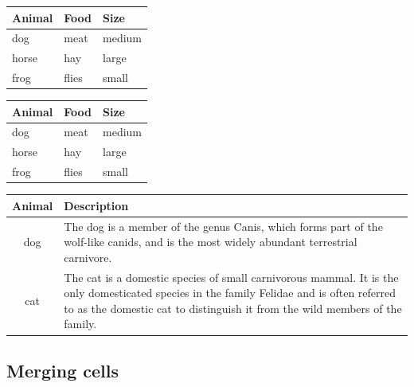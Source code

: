 \documentclass{article}
\begin{document}
\begin{tabular}{lll}
  \toprule
  Animal & Food  & Size   \\
  \midrule
  dog    & meat  & medium \\
  \cmidrule{1-2}
  horse  & hay   & large  \\
  \cmidrule{1-1}
  \cmidrule{3-3}
  frog   & flies & small  \\
  \bottomrule
\end{tabular}

\begin{tabular}{lll}
  \toprule
  Animal & Food  & Size   \\
  \midrule
  dog    & meat  & medium \\
  \cmidrule{1-2}
  horse  & hay   & large  \\
  \cmidrule(r){1-1}
  \cmidrule(rl){2-2}
  \cmidrule(l){3-3}
  frog   & flies & small  \\
  \bottomrule
\end{tabular}

\begin{tabular}{cp{9cm}}
  \toprule
  Animal & Description \\
  \midrule
  dog    & The dog is a member of the genus Canis, which forms part of the
           wolf-like canids, and is the most widely abundant terrestrial
           carnivore. \\
  \addlinespace
  cat    & The cat is a domestic species of small carnivorous mammal. It is the
           only domesticated species in the family Felidae and is often referred
           to as the domestic cat to distinguish it from the wild members of the
           family. \\
  \bottomrule
\end{tabular}

\subsection{Merging cells}
\end{document}
